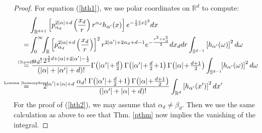 \documentclass{amsart}
\newcommand{\p}[2]{p_{#1}^{#2}\;\!\!}
\newcommand{\myeq}[1]{\mathrel{\overset{\makebox[0pt]{\text{\tiny #1}}}{=}}}
\newcommand{\R}{\mathbb{R}}
\renewcommand{\S}{\mathbb{S}}
\theoremstyle{plain}
\theoremstyle{definition}
\theoremstyle{remark}
\begin{document}
\begin{proof}
For equation (\ref{hth1}), we use polar coordinates on $\R ^d$ to compute:
\begin{align*}
 &\int_{\R^{d+1}}\left[\p{\alpha_d}{2|\alpha|+d}\left(\frac{x_d}{r}\right) r^{\alpha_d}h_{\alpha'}(x)\right] e^{-\frac{1}{2}\|x\|^2} dx \\
 = & \int_0^\infty\!\!\int_{\R} \left[\p{\alpha_d}{2|\alpha|+d}\left(\frac{x_d}{r}\right)\right]^2 r^{2|\alpha'|+2\alpha_d+d-1} e^{-\frac{r^2+x_d^2}{2} }dx_ddr\int_{\S^{d-1}}\left[h_{\alpha'}(\omega)\right]^2 d\omega \\
\myeq{(\ref{Lpn2})}& \  \frac{\alpha_d!\, 2^{\frac{3}{2}d+|\alpha|+2|\alpha '|-\frac{1}{2}} }{\left(|\alpha|+|\alpha'|+d\right)!} { \textstyle
\Gamma\!\left( |\alpha'| \!+\!\frac{d}{2}\right)\Gamma\!\left( |\alpha'|\!+\! \frac{d}{2}\!+\! 1\right) \Gamma\!\left( |\alpha| \!+\! \frac{d+1}{2}\right) }\int_{\S^{d-1}}\!\!\left[h_{\alpha'}(\omega)\right]^2 d\omega \\
\myeq{Lemma \ref{homosphere}}&\quad\quad 2^{|\alpha '|+|\alpha |+d}\,
\frac{\alpha_d!\;\Gamma\!\left(|\alpha '|\!+\!\frac{d}{2}\!+\!1\right)\Gamma\!\left(|\alpha |\!+\!\tfrac{d+1}{2}\right)}{\left(|\alpha '|+|\alpha |+d\right)!} \int_{\R^d} \left[h_{\alpha'}(x')\right]^2 dx'
\end{align*}
For the proof of (\ref{hth2}), we may assume that $\alpha_d \neq \beta_d$. Then we use the same calculation as above to see that Thm. \ref{pthm} now implies the vanishing of the integral.

\end{proof}





\end{document}

